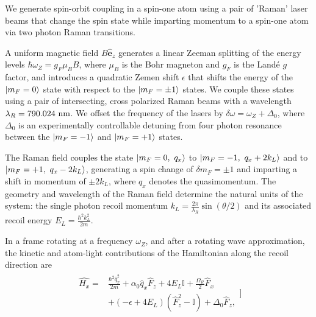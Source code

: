We generate spin-orbit coupling in a spin-one atom using a pair of 'Raman' laser beams that change the spin state while imparting momentum to a spin-one atom via two photon Raman transitions.  

A uniform magnetic field $B\mathbf{\hat{e}}_z$ generates a linear Zeeman splitting of the energy levels $\hbar\omega_Z=g_F\mu_BB$, where $\mu_B$ is the Bohr magneton and $g_F$ is the Land\'e $g$ factor, and introduces a quadratic Zemen shift $\epsilon$ that shifts the energy of the $|m_F=0\rangle$ state with respect to the $|m_F=\pm1\rangle$ states. We couple these states using a pair of intersecting, cross polarized Raman beams with a wavelength $\lambda_R=790.024{\ {\rm nm}}$. We offset the frequency of the lasers by $\delta\omega=\omega_Z+\Delta_0$, where $\Delta_0$ is an experimentally controllable detuning from four photon resonance between the $|m_F=-1\rangle$ and $|m_F=+1\rangle$ states. 

The Raman field couples the state $|m_F=0,\ q_x\rangle$ to $|m_F=-1,\ q_x+2k_L\rangle$ and to $|m_F=+1,\ q_x-2k_L\rangle$, generating a spin change of $\delta m_F=\pm1$ and imparting a shift in momentum of $\pm 2k_L$, where $q_x$ denotes the quasimomentum. The geometry and wavelength of the Raman field determine the natural units of the system: the single photon recoil momentum $k_L=\frac{2\pi}{\lambda_R}\sin(\theta/2)$ and its associated recoil energy $E_L=\frac{\hbar^2k_L^2}{2m}$.


In a frame rotating at a frequency $\omega_Z$, and after a rotating wave approximation, the kinetic and atom-light contributions of the Hamiltonian along the recoil direction are
\begin{align}
\begin{split}
\hat{H_x} = &\frac{\hbar^2\hat{q}_x^2}{2m} + \alpha_0\hat{q}_x\hat{F}_z +4E_L\mathbb{I} + \frac{\Omega_R}{2}\hat{F}_x\\
& +(-\epsilon+4E_L)(\hat{F}_z^2-\mathbb{I}) +\Delta_0\hat{F}_z, 
\label{Eq:SOCone}
\end{split}]
\end{align}	

